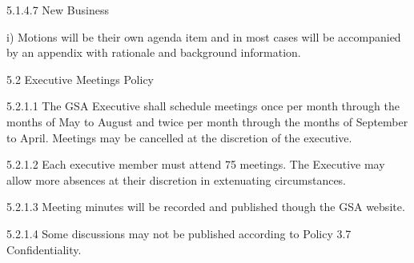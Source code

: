  5.1.4.7 New Business 
 
 
 i) Motions will be their own agenda item and in most cases will be accompanied by an appendix with rationale and background 
 information. 
 
 5.2 Executive Meetings Policy 
 
 5.2.1.1 The GSA Executive shall schedule meetings once per month 
 through the months of May to August and twice per month through 
 the months of September to April. Meetings may be cancelled at the 
 discretion of the executive. 
 
 5.2.1.2 Each executive member must attend 75%
 meetings. The Executive may allow more absences at their 
 discretion in extenuating circumstances. 
 
 5.2.1.3 Meeting minutes will be recorded and published though the GSA 
 website. 
 
 5.2.1.4 Some discussions may not be published according to Policy 3.7 
 Confidentiality. 